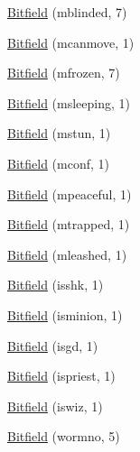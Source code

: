 \begin{DoxyCompactItemize}
\hyperlink{structmonst_a7046debed8c88eedda9c39c925fc1d91}{Bitfield} (mblinded, 7)
\item 
\hyperlink{structmonst_a2c79d82cc36f9d542166dd40fffbb3fd}{Bitfield} (mcanmove, 1)
\item 
\hyperlink{structmonst_aebd81e5920a4fb96a63493fdd6834283}{Bitfield} (mfrozen, 7)
\item 
\hyperlink{structmonst_aeedfdfda4c7b442ba4f007fefdb15f72}{Bitfield} (msleeping, 1)
\item 
\hyperlink{structmonst_a2801ba414251fc4bf37fb8d9b948395c}{Bitfield} (mstun, 1)
\item 
\hyperlink{structmonst_a45a3aa15e69a4fbace7d78a9e06bc1d1}{Bitfield} (mconf, 1)
\item 
\hyperlink{structmonst_a5e7fdc47d0f2d0441357c1fb862263ad}{Bitfield} (mpeaceful, 1)
\item 
\hyperlink{structmonst_a3055a86a22d95fccdd3739df342825a8}{Bitfield} (mtrapped, 1)
\item 
\hyperlink{structmonst_a506650b2716cc26b7aedd9631654ebdb}{Bitfield} (mleashed, 1)
\item 
\hyperlink{structmonst_a97cb29f83ac4e3b61e25b542fc63288f}{Bitfield} (isshk, 1)
\item 
\hyperlink{structmonst_a3dabce48b32095fb40a209f164098f8f}{Bitfield} (isminion, 1)
\item 
\hyperlink{structmonst_afc44a3b8fea15e51ae91473c40fa248f}{Bitfield} (isgd, 1)
\item 
\hyperlink{structmonst_a2f909265c339ae1b7814665ea754ba39}{Bitfield} (ispriest, 1)
\item 
\hyperlink{structmonst_aa63d9df77418ec01ade959769bb750fa}{Bitfield} (iswiz, 1)
\item 
\hyperlink{structmonst_ada168b46c582328365c14e51f2d9af39}{Bitfield} (wormno, 5)
\end{DoxyCompactItemize}
